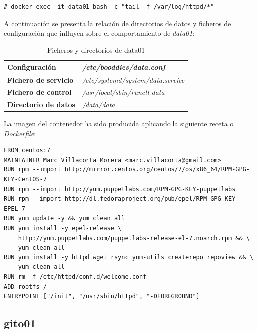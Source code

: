 \documentclass[a4paper,12pt,spanish,final]{epsc_tfc_pfc}
\begin{document}
\begin{lstlisting}[style=dnsmasq]
# docker exec -it data01 bash -c "tail -f /var/log/httpd/*"
\end{lstlisting}

A continuación se presenta la relación de directorios de datos y ficheros de configuración que influyen sobre el comportamiento de \emph{data01}:

\begin{table}[h]

  \centering

  \begin{tabular}{ll}
    \toprule
    \textbf{Configuración}        & \textit{/etc/booddies/data.conf}          \\
    \midrule
    \rowcolor[HTML]{EFEFEF}
    \textbf{Fichero de servicio}  & \textit{/etc/systemd/system/data.service} \\
    \midrule
    \textbf{Fichero de control}   & \textit{/usr/local/sbin/runctl-data}      \\
    \midrule
    \rowcolor[HTML]{EFEFEF}
    \textbf{Directorio de datos}  & \textit{/data/data}                       \\
    \bottomrule
  \end{tabular}

  \caption{Ficheros y directorios de data01}

\end{table}

La imagen del contenedor ha sido producida aplicando la siguiente receta o \emph{Dockerfile}:\\

\begin{lstlisting}[style=dnsmasq]
FROM centos:7
MAINTAINER Marc Villacorta Morera <marc.villacorta@gmail.com>
RUN rpm --import http://mirror.centos.org/centos/7/os/x86_64/RPM-GPG-KEY-CentOS-7
RUN rpm --import http://yum.puppetlabs.com/RPM-GPG-KEY-puppetlabs
RUN rpm --import http://dl.fedoraproject.org/pub/epel/RPM-GPG-KEY-EPEL-7
RUN yum update -y && yum clean all
RUN yum install -y epel-release \
    http://yum.puppetlabs.com/puppetlabs-release-el-7.noarch.rpm && \
    yum clean all
RUN yum install -y httpd wget rsync yum-utils createrepo repoview && \
    yum clean all
RUN rm -f /etc/httpd/conf.d/welcome.conf
ADD rootfs /
ENTRYPOINT ["/init", "/usr/sbin/httpd", "-DFOREGROUND"]
\end{lstlisting}

\subsection{gito01}
\end{document}
